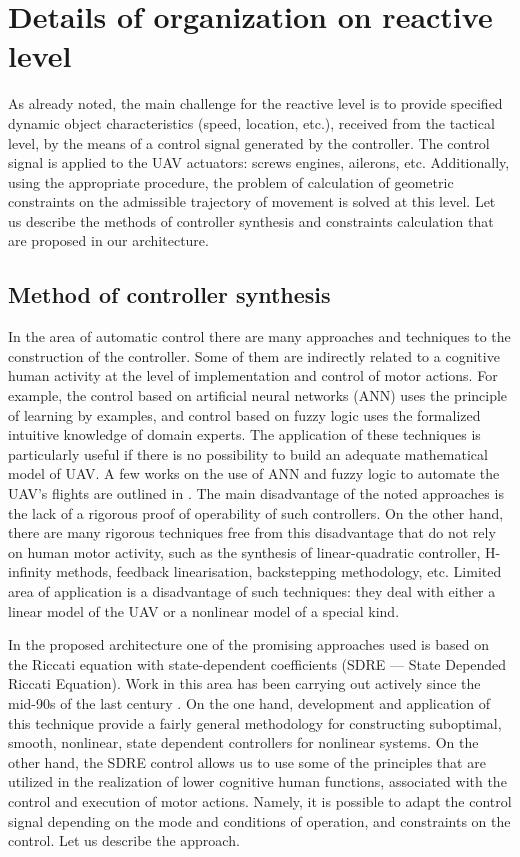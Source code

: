\documentclass[review]{elsarticle}
\begin{document}
\section{Details of organization on reactive level}\label{sec:reactive}
As already noted, the main challenge for the reactive level is to provide specified dynamic object characteristics (speed, location, etc.), received from the tactical level, by the means of a control signal generated by the controller. The control signal is applied to the UAV actuators: screws engines, ailerons, etc. Additionally, using the appropriate procedure, the problem of calculation of geometric constraints on the admissible trajectory of movement is solved at this level. Let us describe the methods of controller synthesis and constraints calculation that are proposed in our architecture.

\subsection{Method of controller synthesis}
In the area of automatic control there are many approaches and techniques to the construction of the controller. Some of them are indirectly related to a cognitive human activity at the level of implementation and control of motor actions. For example, the control based on artificial neural networks (ANN) uses the principle of learning by examples, and control based on fuzzy logic uses the formalized intuitive knowledge of domain experts. The application of these techniques is particularly useful if there is no possibility to build an adequate mathematical model of UAV. A few works on the use of ANN and fuzzy logic to automate the UAV's flights are outlined in \cite{Garcia2009,Buskey2001}. The main disadvantage of the noted approaches is the lack of a rigorous proof of operability of such controllers. On the other hand, there are many rigorous techniques free from this disadvantage that do not rely on human motor activity, such as the synthesis of linear-quadratic controller, H-infinity methods, feedback linearisation, backstepping methodology, etc. Limited area of application is a disadvantage of such techniques: they deal with either a linear model of the UAV or a nonlinear model of a special kind.

In the proposed architecture one of the promising approaches used is based on the Riccati equation with state-dependent coefficients (SDRE --- State Depended Riccati Equation). Work in this area has been carrying out actively since the mid-90s of the last century \cite{Mracek1998,Cimen2008}. On the one hand, development and application of this technique provide a fairly general methodology for constructing suboptimal, smooth, nonlinear, state dependent controllers for nonlinear systems. On the other hand, the SDRE control allows us to use some of the principles that are utilized in the realization of lower cognitive human functions, associated with the control and execution of motor actions. Namely, it is possible to adapt the control signal depending on the mode and conditions of operation, and constraints on the control. Let us describe the approach.
\end{document}

